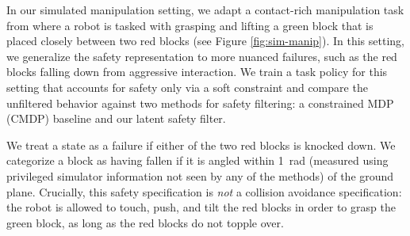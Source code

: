 
In our simulated manipulation setting, we adapt a contact-rich manipulation task from \cite{thananjeyan2021recovery} where a robot is tasked with grasping and lifting a green block that is placed closely between two red blocks (see Figure \ref{fig:sim-manip}).
In this setting, we generalize the safety representation to more nuanced failures, such as the red blocks falling down from aggressive interaction. 
We train a task policy for this setting that accounts for safety only via a soft constraint and compare the unfiltered behavior against two methods for safety filtering: a constrained MDP (CMDP) baseline and our latent safety filter.


We treat a state as a failure if either of the two red blocks is knocked down.
We categorize a block as having fallen if it is angled within \SI{1}{\radian} (measured using privileged simulator information not seen by any of the methods) of the ground plane. 
Crucially, this safety specification is \textit{not} a collision avoidance specification: the robot is allowed to touch, push, and tilt the red blocks in order to grasp the green block, as long as the red blocks do not topple over.

